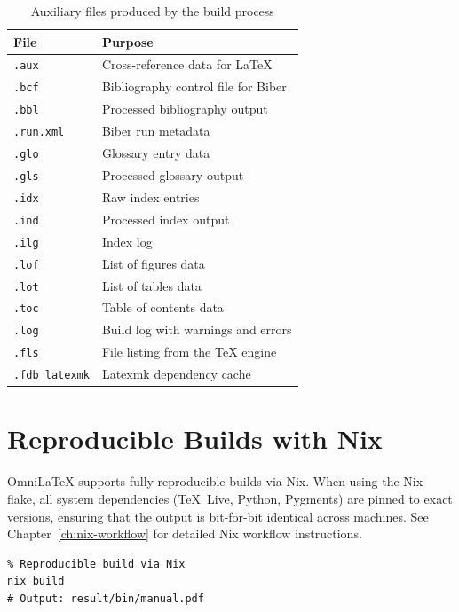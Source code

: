 \begin{table}[htbp]
    \centering
    \caption{Auxiliary files produced by the build process}
    \label{tab:aux-files}
    \begin{tabular}{@{} l p{7cm} @{}}
        \toprule
        \textbf{File} & \textbf{Purpose} \\
        \midrule
        \texttt{.aux}   & Cross-reference data for \LaTeX{} \\
        \texttt{.bcf}   & Bibliography control file for Biber \\
        \texttt{.bbl}   & Processed bibliography output \\
        \texttt{.run.xml} & Biber run metadata \\
        \texttt{.glo}   & Glossary entry data \\
        \texttt{.gls}   & Processed glossary output \\
        \texttt{.idx}   & Raw index entries \\
        \texttt{.ind}   & Processed index output \\
        \texttt{.ilg}   & Index log \\
        \texttt{.lof}   & List of figures data \\
        \texttt{.lot}   & List of tables data \\
        \texttt{.toc}   & Table of contents data \\
        \texttt{.log}   & Build log with warnings and errors \\
        \texttt{.fls}   & File listing from the \TeX{} engine \\
        \texttt{.fdb\_latexmk} & Latexmk dependency cache \\
        \bottomrule
    \end{tabular}
\end{table}

\section*{Reproducible Builds with Nix}

OmniLaTeX supports fully reproducible builds via Nix.  When using the Nix
flake, all system dependencies (TeX~Live, Python, Pygments) are pinned to
exact versions, ensuring that the output is bit-for-bit identical across
machines.  See Chapter~\ref{ch:nix-workflow} for detailed Nix workflow instructions.

\begin{verbatim}
% Reproducible build via Nix
nix build
# Output: result/bin/manual.pdf
\end{verbatim}

